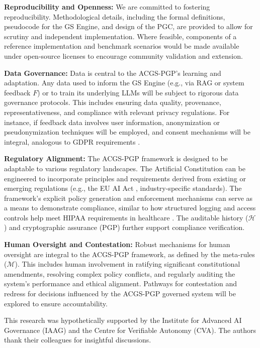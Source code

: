 \documentclass[sigconf,review,screen]{acmart}
\begin{document}
\textbf{Reproducibility and Openness:} We are committed to fostering reproducibility. Methodological details, including the formal definitions, pseudocode for the GS Engine, and design of the PGC, are provided to allow for scrutiny and independent implementation. Where feasible, components of a reference implementation and benchmark scenarios would be made available under open-source licenses to encourage community validation and extension.

\textbf{Data Governance:} Data is central to the ACGS-PGP's learning and adaptation. Any data used to inform the GS Engine (e.g., via RAG or system feedback $F$) or to train its underlying LLMs will be subject to rigorous data governance protocols. This includes ensuring data quality, provenance, representativeness, and compliance with relevant privacy regulations. For instance, if feedback data involves user information, anonymization or pseudonymization techniques will be employed, and consent mechanisms will be integral, analogous to GDPR requirements \cite{voigt2017eu}.

\textbf{Regulatory Alignment:} The ACGS-PGP framework is designed to be adaptable to various regulatory landscapes. The Artificial Constitution can be engineered to incorporate principles and requirements derived from existing or emerging regulations (e.g., the EU AI Act \cite{europeancommission2021aiact}, industry-specific standards). The framework's explicit policy generation and enforcement mechanisms can serve as a means to demonstrate compliance, similar to how structured logging and access controls help meet HIPAA requirements in healthcare \cite{usdhhs2013hipaa}. The auditable history ($\mathcal{H}$) and cryptographic assurance (PGP) further support compliance verification.

\textbf{Human Oversight and Contestation:} Robust mechanisms for human oversight are integral to the ACGS-PGP framework, as defined by the meta-rules ($\mathcal{M}$). This includes human involvement in ratifying significant constitutional amendments, resolving complex policy conflicts, and regularly auditing the system's performance and ethical alignment. Pathways for contestation and redress for decisions influenced by the ACGS-PGP governed system will be explored to ensure accountability.

\begin{acks}
This research was hypothetically supported by the Institute for Advanced AI Governance (IAAG) and the Centre for Verifiable Autonomy (CVA). The authors thank their colleagues for insightful discussions.
\end{acks}
\end{document}

